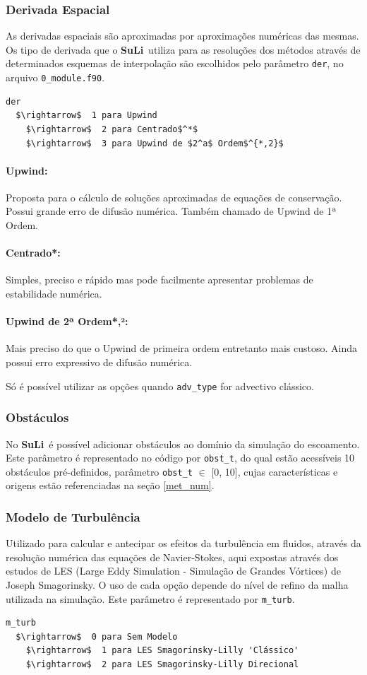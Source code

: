 \documentclass[12pt, a4paper]{article}
\newcommand{\SL}{{\bf SuLi}}
\begin{document}
\subsubsection{Derivada Espacial}
As derivadas espaciais são aproximadas por aproximações numéricas das mesmas. Os tipo de derivada que o \SL\ utiliza para as resoluções dos métodos através de determinados esquemas de interpolação são escolhidos pelo parâmetro \verb|der|, no arquivo \verb|0_module.f90|.
\begin{lstlisting}[escapeinside='']
der	
  $\rightarrow$  1 para Upwind
	$\rightarrow$  2 para Centrado$^*$
	$\rightarrow$  3 para Upwind de $2^a$ Ordem$^{*,2}$
\end{lstlisting}

\paragraph{Upwind:} Proposta para o cálculo de soluções aproximadas de equações de conservação. Possui grande erro de difusão numérica. Também chamado de Upwind de 1ª Ordem.
\paragraph{Centrado*:} Simples, preciso e rápido mas pode facilmente apresentar problemas de estabilidade numérica.
\paragraph{Upwind de 2ª Ordem*,²:} Mais preciso do que o Upwind de primeira ordem entretanto mais custoso. Ainda possui erro expressivo de difusão numérica. 

\vspace{0.5cm}
\noindent *Só é possível utilizar as opções quando \verb|adv_type| for advectivo clássico.

\subsubsection{Obstáculos} \label{obst}
No \SL\ é possível adicionar obstáculos ao domínio da simulação do escoamento. Este parâmetro é representado no código por \verb|obst_t|, do qual estão acessíveis 10 obstáculos pré-definidos, parâmetro \verb|obst_t| $\in$ [0, 10], cujas características e origens estão referenciadas na seção \ref{met_num}.

\subsubsection{Modelo de Turbulência}
Utilizado para calcular e antecipar os efeitos da turbulência em fluidos, através da resolução numérica das equações de Navier-Stokes, aqui expostas através dos estudos de LES (Large Eddy Simulation - Simulação de Grandes Vórtices) de Joseph Smagorinsky. O uso de cada opção depende do nível de refino da malha utilizada na simulação. Este parâmetro é representado por \verb|m_turb|.
\begin{lstlisting}[escapeinside='']
m_turb  
  $\rightarrow$  0 para Sem Modelo
	$\rightarrow$  1 para LES Smagorinsky-Lilly 'Clássico'
	$\rightarrow$  2 para LES Smagorinsky-Lilly Direcional
\end{lstlisting}
\end{document}

